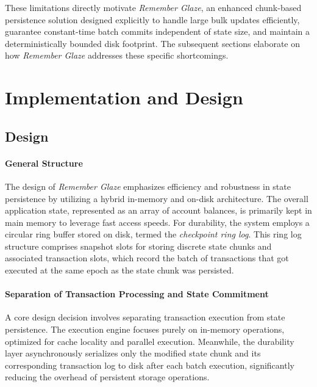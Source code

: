 \documentclass[conference]{IEEEtran}
\begin{document}
These limitations directly motivate \textit{Remember Glaze}, an enhanced chunk-based persistence solution designed explicitly to handle large bulk updates efficiently, guarantee constant-time batch commits independent of state size, and maintain a deterministically bounded disk footprint. The subsequent sections elaborate on how \textit{Remember Glaze} addresses these specific shortcomings.
\section{Implementation and Design}

\subsection{Design}
\paragraph{General Structure}
The design of \textit{Remember Glaze} emphasizes efficiency and robustness in state persistence by utilizing a hybrid in-memory and on-disk architecture. The overall application state, represented as an array of account balances, is primarily kept in main memory to leverage fast access speeds. For durability, the system employs a circular ring buffer stored on disk, termed the \textit{checkpoint ring log}. This ring log structure comprises snapshot slots for storing discrete state chunks and associated transaction slots, which record the batch of transactions that got executed at the same epoch as the state chunk was persisted.

\paragraph{Separation of Transaction Processing and State Commitment}
A core design decision involves separating transaction execution from state persistence. The execution engine focuses purely on in-memory operations, optimized for cache locality and parallel execution. Meanwhile, the durability layer asynchronously serializes only the modified state chunk and its corresponding transaction log to disk after each batch execution, significantly reducing the overhead of persistent storage operations.
\end{document}
